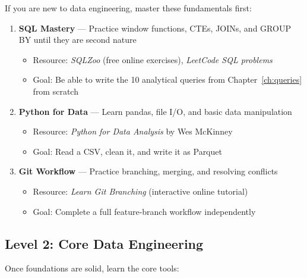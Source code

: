 \documentclass[12pt, a4paper, oneside]{report}
\begin{document}
If you are new to data engineering, master these fundamentals first:

\begin{enumerate}[label=\textcolor{primary}{\textbf{\arabic*.}}]
    \item \textbf{SQL Mastery} --- Practice window functions, CTEs, JOINs, and GROUP BY until they are second nature
    \begin{itemize}
        \item Resource: \textit{SQLZoo} (free online exercises), \textit{LeetCode SQL problems}
        \item Goal: Be able to write the 10 analytical queries from Chapter~\ref{ch:queries} from scratch
    \end{itemize}
    \item \textbf{Python for Data} --- Learn pandas, file I/O, and basic data manipulation
    \begin{itemize}
        \item Resource: \textit{Python for Data Analysis} by Wes McKinney
        \item Goal: Read a CSV, clean it, and write it as Parquet
    \end{itemize}
    \item \textbf{Git Workflow} --- Practice branching, merging, and resolving conflicts
    \begin{itemize}
        \item Resource: \textit{Learn Git Branching} (interactive online tutorial)
        \item Goal: Complete a full feature-branch workflow independently
    \end{itemize}
\end{enumerate}

\subsection{Level 2: Core Data Engineering}

Once foundations are solid, learn the core tools:
\end{document}
